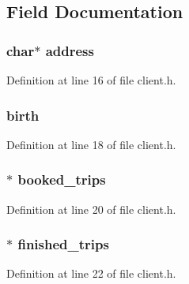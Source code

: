 \subsection{Field Documentation}
\hypertarget{structclient_a879a8cdf605d02f8af8b2e216b8764f2}{}
\subsubsection[{address}]{\setlength{\rightskip}{0pt plus 5cm}char$\ast$ address}\label{structclient_a879a8cdf605d02f8af8b2e216b8764f2}


Definition at line 16 of file client.\+h.

\hypertarget{structclient_a5048bf506f515ff71b6337104a55b3dd}{}
\subsubsection[{birth}]{ birth}\label{structclient_a5048bf506f515ff71b6337104a55b3dd}


Definition at line 18 of file client.\+h.

\hypertarget{structclient_a64455844b82657fa67c0a45988aad665}{}
\subsubsection[{booked\+\_\+trips}]{$\ast$ booked\+\_\+trips}\label{structclient_a64455844b82657fa67c0a45988aad665}


Definition at line 20 of file client.\+h.

\hypertarget{structclient_a75a9d663b39a1337a2630f19bab25847}{}
\subsubsection[{finished\+\_\+trips}]{$\ast$ finished\+\_\+trips}\label{structclient_a75a9d663b39a1337a2630f19bab25847}


Definition at line 22 of file client.\+h.

